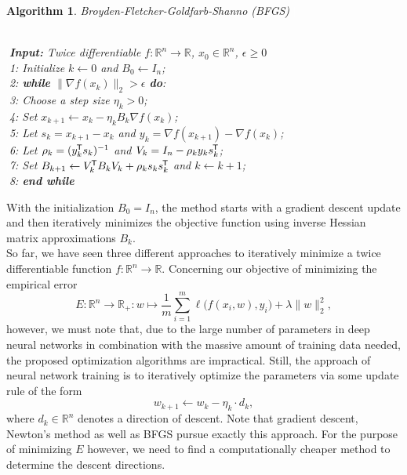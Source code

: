 \documentclass[11pt, a4paper]{article}
\newtheorem{algorithm}[theorem]{Algorithm}
\newcommand{\R}{\mathbb{R}}
\newcommand*{\tr}{^{\mkern-1.5mu\mathsf{T}}}
\begin{document}
\begin{algorithm}
\caption{Broyden-Fletcher-Goldfarb-Shanno (BFGS) \textcolor{white}{$\Big |$}} \ \\
\textcolor{white}{$\Big |$}\textbf{Input:} Twice differentiable $f: \R^n \to \R$, $x_0 \in \R^n$, $\epsilon \geq 0$ \\
\textcolor{white}{$\Big |$}1: Initialize $k \leftarrow 0$ and $B_0 \leftarrow I_n$; \\
\textcolor{white}{$\Big |$}2: \textbf{while} $ \big \| \nabla f(x_k) \big \|_2 > \epsilon $ \textbf{do}: \\
\textcolor{white}{$\Big |$}3: \quad Choose a step size $\eta_k > 0$; \\
\textcolor{white}{$\Big |$}4: \quad Set $x_{k+1} \leftarrow x_k - \eta_k B_k \nabla f(x_{k})$; \\
\textcolor{white}{$\Big |$}5: \quad Let $s_k = x_{k+1} - x_{k}$ and $y_k = \nabla f(x_{k+1}) - \nabla f(x_{k})$; \\
\textcolor{white}{$\Big |$}6: \quad Let $\rho_k = (y_k\tr s_k)^{-1}$ and $V_k = I_n - \rho_k y_k s_k\tr $; \\
\textcolor{white}{$\Big |$}7: \quad Set $B_{k+1} \leftarrow V_k\tr B_{k}V_k + \rho_k s_k s_k\tr $ and $k \leftarrow k+1$; \\
\textcolor{white}{$\Big |$}8: \textbf{end while}
\end{algorithm}

With the initialization $B_0 = I_n$, the method starts with a gradient descent update and then iteratively minimizes the objective function using inverse Hessian matrix approximations $B_k$. \\

So far, we have seen three different approaches to iteratively minimize a twice differentiable function $f: \R^n \to \R$. Concerning our objective of minimizing the empirical error
\[ E : \R^n \to \R_+ : w \mapsto \frac{1}{m} \sum_{i=1}^{m} \ell \big ( f(x_i,w),y_i \big) + \lambda \big \| w \big \|_2^2, \]
however, we must note that, due to the large number of parameters in deep neural networks in combination with the massive amount of training data needed, the proposed optimization algorithms are impractical. Still, the approach of neural network training is to iteratively optimize the parameters via some update rule of the form
\[ w_{k+1} \leftarrow w_k - \eta_k \cdot d_k, \]
where $d_k \in \R^n$ denotes a direction of descent. Note that gradient descent, Newton's method as well as BFGS pursue exactly this approach. For the purpose of minimizing $E$ however, we need to find a computationally cheaper method to determine the descent directions. \\
\end{document}
